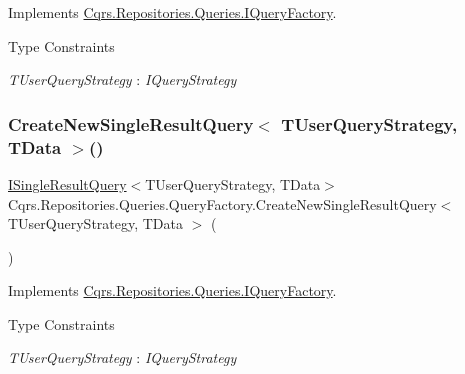 Implements \hyperlink{interfaceCqrs_1_1Repositories_1_1Queries_1_1IQueryFactory_af8b443851e8112dc70cbc7fe32029ccb}{Cqrs.\+Repositories.\+Queries.\+I\+Query\+Factory}.

\begin{Desc}
\item[Type Constraints]\begin{description}
\item[{\em T\+User\+Query\+Strategy} : {\em I\+Query\+Strategy}]\end{description}
\end{Desc}
\mbox{\label{classCqrs_1_1Repositories_1_1Queries_1_1QueryFactory_aefca41f8cab3f333984b782e7c87f3d1}} 
\subsubsection{\texorpdfstring{Create\+New\+Single\+Result\+Query$<$ T\+User\+Query\+Strategy, T\+Data $>$()}{CreateNewSingleResultQuery< TUserQueryStrategy, TData >()}}
{\footnotesize\ttfamily \hyperlink{interfaceCqrs_1_1Repositories_1_1Queries_1_1ISingleResultQuery}{I\+Single\+Result\+Query}$<$T\+User\+Query\+Strategy, T\+Data$>$ Cqrs.\+Repositories.\+Queries.\+Query\+Factory.\+Create\+New\+Single\+Result\+Query$<$ T\+User\+Query\+Strategy, T\+Data $>$ (\begin{DoxyParamCaption}{ }\end{DoxyParamCaption})}



Implements \hyperlink{interfaceCqrs_1_1Repositories_1_1Queries_1_1IQueryFactory_a237aee0f99d8bfc03d8f10595f16ecea}{Cqrs.\+Repositories.\+Queries.\+I\+Query\+Factory}.

\begin{Desc}
\item[Type Constraints]\begin{description}
\item[{\em T\+User\+Query\+Strategy} : {\em I\+Query\+Strategy}]\end{description}
\end{Desc}


